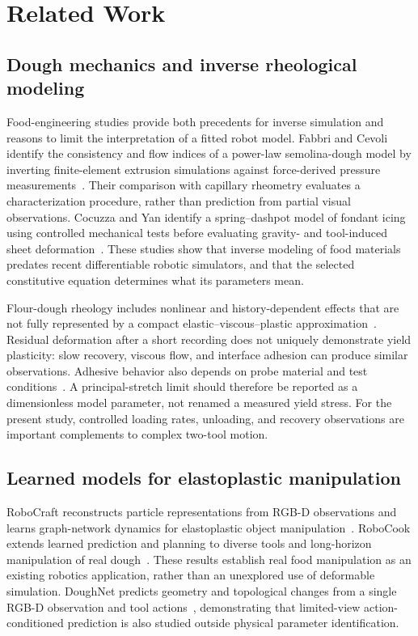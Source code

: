 \section{Related Work}
\label{sec:related}

\subsection{Dough mechanics and inverse rheological modeling}

Food-engineering studies provide both precedents for inverse simulation and reasons to limit the interpretation of a fitted robot model. Fabbri and Cevoli identify the consistency and flow indices of a power-law semolina-dough model by inverting finite-element extrusion simulations against force-derived pressure measurements~\cite{fabbri2015}. Their comparison with capillary rheometry evaluates a characterization procedure, rather than prediction from partial visual observations. Cocuzza and Yan identify a spring--dashpot model of fondant icing using controlled mechanical tests before evaluating gravity- and tool-induced sheet deformation~\cite{cocuzza2018}. These studies show that inverse modeling of food materials predates recent differentiable robotic simulators, and that the selected constitutive equation determines what its parameters mean.

Flour-dough rheology includes nonlinear and history-dependent effects that are not fully represented by a compact elastic--viscous--plastic approximation~\cite{yazar2023}. Residual deformation after a short recording does not uniquely demonstrate yield plasticity: slow recovery, viscous flow, and interface adhesion can produce similar observations. Adhesive behavior also depends on probe material and test conditions~\cite{adhesion2014}. A principal-stretch limit should therefore be reported as a dimensionless model parameter, not renamed a measured yield stress. For the present study, controlled loading rates, unloading, and recovery observations are important complements to complex two-tool motion.

\subsection{Learned models for elastoplastic manipulation}

RoboCraft reconstructs particle representations from RGB-D observations and learns graph-network dynamics for elastoplastic object manipulation~\cite{robocraft2022}. RoboCook extends learned prediction and planning to diverse tools and long-horizon manipulation of real dough~\cite{robocook2023}. These results establish real food manipulation as an existing robotics application, rather than an unexplored use of deformable simulation. DoughNet predicts geometry and topological changes from a single RGB-D observation and tool actions~\cite{doughnet2024}, demonstrating that limited-view action-conditioned prediction is also studied outside physical parameter identification.

